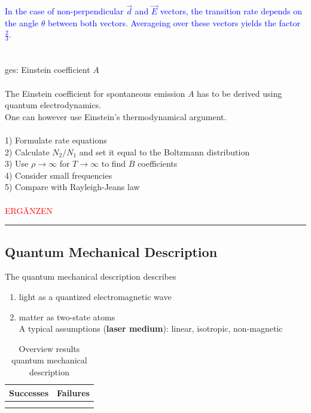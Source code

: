 \documentclass{article}
\begin{document}
{	\textcolor{blue}{In the case of non-perpendicular $\vec{d}$ and $\vec{E}$ vectors, the transition rate depends on the angle $\theta$ between both vectors. Averageing over these vectors yields the factor $\frac{2}{3}$.}\\
	\\
	\\
	ges: Einstein coefficient $A$\\
	\\
	The Einstein coefficient for spontaneous emission $A$ has to be derived using quantum electrodynamics.\\
	One can however use Einstein's thermodynamical argument.\\
	\\
	1) Formulate rate equations\\
	2) Calculate $N_2/N_1$ and set it equal to the Boltzmann distribution\\
	3) Use $\rho\to\infty$ for $T\to\infty$ to find $B$ coefficients \\
	4) Consider small frequencies \\
	5) Compare with Rayleigh-Jeans law\\
	\\
	\textcolor{red}{ERGÄNZEN}
\hrule
}


\newpage


\subsection{Quantum Mechanical Description}
The quantum mechanical description describes
	\begin{enumerate}
		\item light as a quantized electromagnetic wave
		\item matter as two-state atoms\\
		A typical assumptions (\textbf{laser medium}): linear, isotropic, non-magnetic
	\end{enumerate}


\begin{table}[h]
	\centering
	\caption{Overview results quantum mechanical description}
	\begin{tabularx}{\textwidth}{X|X}
		\hline\hline
			Successes & Failures \\
		\hline
			 &  \\
		\hline
			&  \\
		\hline\hline	
	\end{tabularx}
\end{table}
\end{document}
